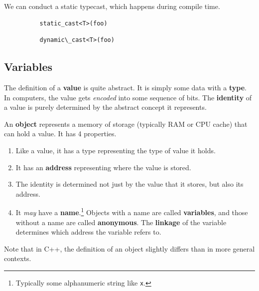 \documentclass{article}
\newcounter{definition}[section]
\newcounter{code}[section]
\begin{document}
      \begin{definition}
        \label{def:static-cast}
        We can conduct a static typecast, which happens during compile time. 
        \begin{lstlisting}
          static_cast<T>(foo)
        \end{lstlisting}
      \end{definition}

      \begin{definition}
        \label{def:dynamic-cast}
        \begin{lstlisting}
          dynamic\_cast<T>(foo)
        \end{lstlisting}
      \end{definition}

  \subsection{Variables}

      \begin{definition}[Value]
        \label{def:value}
        The definition of a \textbf{value} is quite abstract. It is simply some data with a \textbf{type}. In computers, the value gets \textit{encoded} into some sequence of bits. The \textbf{identity} of a value is purely determined by the abstract concept it represents. 
      \end{definition}

      \begin{definition}
        \label{def:objects-and-variables}
        An \textbf{object} represents a memory of storage (typically RAM or CPU cache) that can hold a value. It has 4 properties. 
        \begin{enumerate}
          \item Like a value, it has a type representing the type of value it holds. 
          \item It has an \textbf{address} representing where the value is stored.  
          \item The identity is determined not just by the value that it stores, but also its address. 
          \item It \textit{may} have a \textbf{name}.\footnote{Typically some alphanumeric string like \texttt{x}.} Objects with a name are called \textbf{variables}, and those without a name are called \textbf{anonymous}. The \textbf{linkage} of the variable determines which address the variable refers to. 
        \end{enumerate}
        Note that in C++, the definition of an object slightly differs than in more general contexts. 
      \end{definition} 
\end{document}
